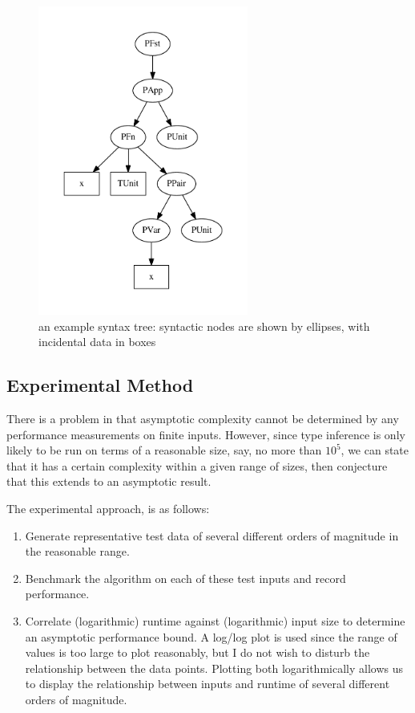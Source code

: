 \begin{figure}
\centering
\includegraphics[height=4in]{chapters/evaluation/figures/example-tree.pdf}
\caption{an example syntax tree: syntactic nodes are shown by ellipses, with incidental data in boxes}
\label{fig:example-tree}
\end{figure}

\subsection{Experimental Method}
There is a problem in that asymptotic complexity cannot be determined by any performance measurements on finite inputs.
However, since type inference is only likely to be run on terms of a reasonable size, say, no more than \(10^5\), we can state that it has a certain complexity within a given range of sizes, then conjecture that this extends to an asymptotic result.

The experimental approach, is as follows:
\begin{enumerate}
\item
Generate representative test data of several different orders of magnitude in the reasonable range.
\item
Benchmark the algorithm on each of these test inputs and record performance.
\item
Correlate (logarithmic) runtime against (logarithmic) input size to determine an asymptotic performance bound.
A log/log plot is used since the range of values is too large to plot reasonably, but I do not wish to disturb the relationship between the data points.
Plotting both logarithmically allows us to display the relationship between inputs and runtime of several different orders of magnitude.
\end{enumerate}

